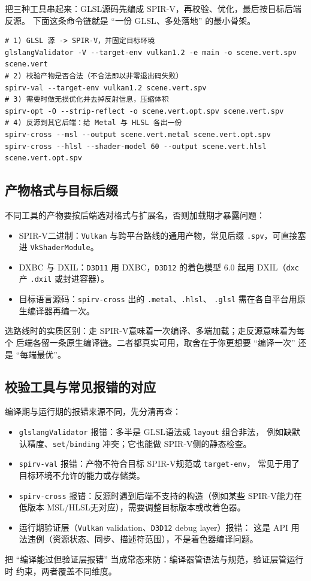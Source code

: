 \documentclass[12pt,a4paper,fontset=fandol]{ctexbook}
\newcommand{\Tp}[1]{\texttt{#1}}
\newcommand{\Bk}{\discretionary{}{}{}}
\newcommand{\Lang}[1]{\textsf{#1}}
\newcommand{\GSL}{\Lang{GLSL}}
\newcommand{\HSL}{\Lang{HLSL}}
\newcommand{\MSL}{\Lang{MSL}}
\newcommand{\SPIV}{\Lang{SPIR-V}}
\begin{document}
把三种工具串起来：\GSL 源码先编成 \SPIV，再校验、优化，最后按目标后端反源。
下面这条命令链就是 ``一份 \GSL、多处落地'' 的最小骨架。

\begin{lstlisting}[style=shellstyle,caption={从 GLSL 到目标语言源码的一条命令链},label={lst:apB-chain}]
# 1) GLSL 源 -> SPIR-V，并固定目标环境
glslangValidator -V --target-env vulkan1.2 -e main -o scene.vert.spv scene.vert
# 2) 校验产物是否合法（不合法即以非零退出码失败）
spirv-val --target-env vulkan1.2 scene.vert.spv
# 3) 需要时做无损优化并去掉反射信息，压缩体积
spirv-opt -O --strip-reflect -o scene.vert.opt.spv scene.vert.spv
# 4) 反源到其它后端：给 Metal 与 HLSL 各出一份
spirv-cross --msl --output scene.vert.metal scene.vert.opt.spv
spirv-cross --hlsl --shader-model 60 --output scene.vert.hlsl scene.vert.opt.spv
\end{lstlisting}

\subsection{产物格式与目标后缀}

不同工具的产物要按后端选对格式与扩展名，否则加载期才暴露问题：
\begin{itemize}
  \item \SPIV 二进制：\Tp{Vulkan} 与跨平台路线的通用产物，常见后缀
        \Tp{.spv}，可直接塞进 \Tp{VkShaderModule}。
  \item DXBC 与 DXIL：\Tp{D3D11} 用 DXBC，\Tp{D3D12} 的着色模型 6.0 起用
        DXIL（\Tp{dxc} 产 \Tp{.dxil} 或封进容器）。
  \item 目标语言源码：\Tp{spirv-cross} 出的 \Tp{.metal}、\Tp{.hlsl}、
        \Tp{.glsl} 需在各自平台用原生编译器再编一次。
\end{itemize}
选路线时的实质区别：走 \SPIV 意味着一次编译、多端加载；走反源意味着为每个
后端各留一条原生编译链。二者都真实可用，取舍在于你更想要 ``编译一次'' 还是
``每端最优''。

\subsection{校验工具与常见报错的对应}

编译期与运行期的报错来源不同，先分清再查：
\begin{itemize}
  \item \Tp{glslangValidator} 报错：多半是 \GSL 语法或 \Tp{layout} 组合非法，
        例如缺默认精度、\Tp{set}/{\Bk}\Tp{binding} 冲突；它也能做 \SPIV 侧的静态检查。
  \item \Tp{spirv-val} 报错：产物不符合目标 \SPIV 规范或 \Tp{target-env}，
        常见于用了目标环境不允许的能力或存储类。
  \item \Tp{spirv-cross} 报错：反源时遇到后端不支持的构造（例如某些
        \SPIV 能力在低版本 \MSL/{\Bk}\HSL 无对应），需要调整目标版本或改着色器。
  \item 运行期验证层（\Tp{Vulkan} validation、\Tp{D3D12} debug layer）报错：
        这是 API 用法违例（资源状态、同步、描述符范围），不是着色器编译问题。
\end{itemize}
把 ``编译能过但验证层报错'' 当成常态来防：编译器管语法与规范，验证层管运行时
约束，两者覆盖不同维度。
\end{document}
